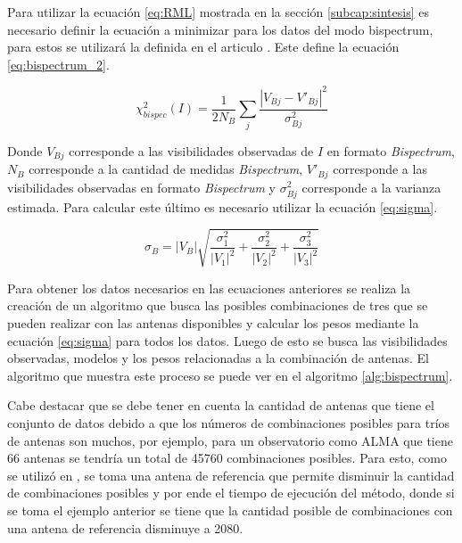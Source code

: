 Para utilizar la ecuación \ref{eq:RML} mostrada en la sección \ref{subcap:sintesis} es necesario definir la ecuación a minimizar para los datos del modo bispectrum, para estos se utilizará la definida en el articulo \cite{Chael_2018}. Este define la ecuación \ref{eq:bispectrum_2}. 

\begin{equation}
    \chi^{2}_{bispec}(I) = \frac{1}{2N_{B}} \sum_{j} \frac{| V_{Bj}  - V'_{Bj}|^2}{\sigma^{2}_{Bj}}
    \label{eq:bispectrum_2}
\end{equation}

Donde $V_{Bj}$ corresponde a las visibilidades observadas de $I$ en formato \textit{Bispectrum}, $N_{B}$ corresponde a la cantidad de medidas \textit{Bispectrum}, $V'_{Bj}$ corresponde a las visibilidades observadas en formato \textit{Bispectrum} y $\sigma^{2}_{Bj}$ corresponde a la varianza estimada. Para calcular este último es necesario utilizar la ecuación \ref{eq:sigma}.

\begin{equation}
    \sigma_{B} = |V_{B}| \sqrt{\frac{\sigma^{2}_{1}}{|V_{1}|^{2}} + \frac{\sigma^{2}_{2}}{|V_{2}|^{2}} + \frac{\sigma^{2}_{3}}{|V_{3}|^{2}}}
    \label{eq:sigma}
\end{equation}

Para obtener los datos necesarios en las ecuaciones anteriores se realiza la creación de un algoritmo que busca las posibles combinaciones de tres que se pueden realizar con las antenas disponibles y calcular los pesos mediante la ecuación \ref{eq:sigma} para todos los datos. Luego de esto se busca las visibilidades observadas, modelos y los pesos relacionadas a la combinación de antenas. El algoritmo que muestra este proceso se puede ver en el algoritmo \ref{alg:bispectrum}.

Cabe destacar que se debe tener en cuenta la cantidad de antenas que tiene el conjunto de datos debido a que los números de combinaciones posibles para tríos de antenas son muchos, por ejemplo, para un observatorio como ALMA que tiene 66 antenas \citep{antenas_alma} se tendría un total de 45760 combinaciones posibles. Para esto, como se utilizó en \citet{Chael_2018}, se toma una antena de referencia que permite disminuir la cantidad de combinaciones posibles y por ende el tiempo de ejecución del método, donde si se toma el ejemplo anterior se tiene que la cantidad posible de combinaciones con una antena de referencia disminuye a 2080. 

